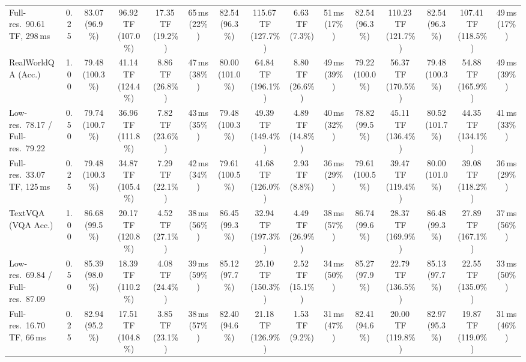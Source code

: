 \begin{table}[t]
{\begin{tabular}{l c | c c c c | c c c c | c c | c c c}
{\footnotesize Full-res.\ 90.61\,TF, 298\,ms} & 0.25 & 83.07 (96.9\%) & 96.92\,TF (107.0\%) & 17.35\,TF (19.2\%) & 65\,ms (22\%) & 82.54 (96.3\%) & 115.67\,TF (127.7\%) & 6.63\,TF (7.3\%) & 51\,ms (17\%) & 82.54 (96.3\%) & 110.23\,TF (121.7\%) & 82.54 (96.3\%) & 107.41\,TF (118.5\%) & 49\,ms (17\%) \\
\cmidrule(lr){1-15}
RealWorldQA (Acc.) & 1.00 & \cellcolor{gray!15}79.48 (100.3\%) & 41.14\,TF (124.4\%) & 8.86\,TF (26.8\%) & 47\,ms (38\%) & \cellcolor{gray!15}80.00 (101.0\%) & 64.84\,TF (196.1\%) & 8.80\,TF (26.6\%) & 49\,ms (39\%) & \cellcolor{gray!15}79.22 (100.0\%) & 56.37\,TF (170.5\%) & \cellcolor{gray!15}79.48 (100.3\%) & 54.88\,TF (165.9\%) & 49\,ms (39\%) \\
{\footnotesize Low-res.\ 78.17 / Full-res.\ 79.22} & 0.50 & \cellcolor{gray!15}79.74 (100.7\%) & 36.96\,TF (111.8\%) & 7.82\,TF (23.6\%) & 43\,ms (35\%) & \cellcolor{gray!15}79.48 (100.3\%) & 49.39\,TF (149.4\%) & 4.89\,TF (14.8\%) & 40\,ms (32\%) & \cellcolor{gray!15}78.82 (99.5\%) & 45.11\,TF (136.4\%) & \cellcolor{gray!15}80.52 (101.7\%) & 44.35\,TF (134.1\%) & 41\,ms (33\%) \\
{\footnotesize Full-res.\ 33.07\,TF, 125\,ms} & 0.25 & \cellcolor{gray!15}79.48 (100.3\%) & 34.87\,TF (105.4\%) & 7.29\,TF (22.1\%) & 42\,ms (34\%) & \cellcolor{gray!15}79.61 (100.5\%) & 41.68\,TF (126.0\%) & 2.93\,TF (8.8\%) & 36\,ms (29\%) & \cellcolor{gray!15}79.61 (100.5\%) & 39.47\,TF (119.4\%) & \cellcolor{gray!15}80.00 (101.0\%) & 39.08\,TF (118.2\%) & 36\,ms (29\%) \\
\cmidrule(lr){1-15}
TextVQA (VQA Acc.) & 1.00 & \cellcolor{gray!15}86.68 (99.5\%) & 20.17\,TF (120.8\%) & 4.52\,TF (27.1\%) & 38\,ms (56\%) & \cellcolor{gray!15}86.45 (99.3\%) & 32.94\,TF (197.3\%) & 4.49\,TF (26.9\%) & 38\,ms (57\%) & \cellcolor{gray!15}86.74 (99.6\%) & 28.37\,TF (169.9\%) & \cellcolor{gray!15}86.48 (99.3\%) & 27.89\,TF (167.1\%) & 37\,ms (56\%) \\
{\footnotesize Low-res.\ 69.84 / Full-res.\ 87.09} & 0.50 & \cellcolor{gray!15}85.39 (98.0\%) & 18.39\,TF (110.2\%) & 4.08\,TF (24.4\%) & 39\,ms (59\%) & 85.12 (97.7\%) & 25.10\,TF (150.3\%) & 2.52\,TF (15.1\%) & 34\,ms (50\%) & 85.27 (97.9\%) & 22.79\,TF (136.5\%) & 85.13 (97.7\%) & 22.55\,TF (135.0\%) & 33\,ms (50\%) \\
{\footnotesize Full-res.\ 16.70\,TF, 66\,ms} & 0.25 & 82.94 (95.2\%) & 17.51\,TF (104.8\%) & 3.85\,TF (23.1\%) & 38\,ms (57\%) & 82.40 (94.6\%) & 21.18\,TF (126.9\%) & 1.53\,TF (9.2\%) & 31\,ms (47\%) & 82.41 (94.6\%) & 20.00\,TF (119.8\%) & 82.97 (95.3\%) & 19.87\,TF (119.0\%) & 31\,ms (46\%) \\

\end{tabular}}
\end{table}
